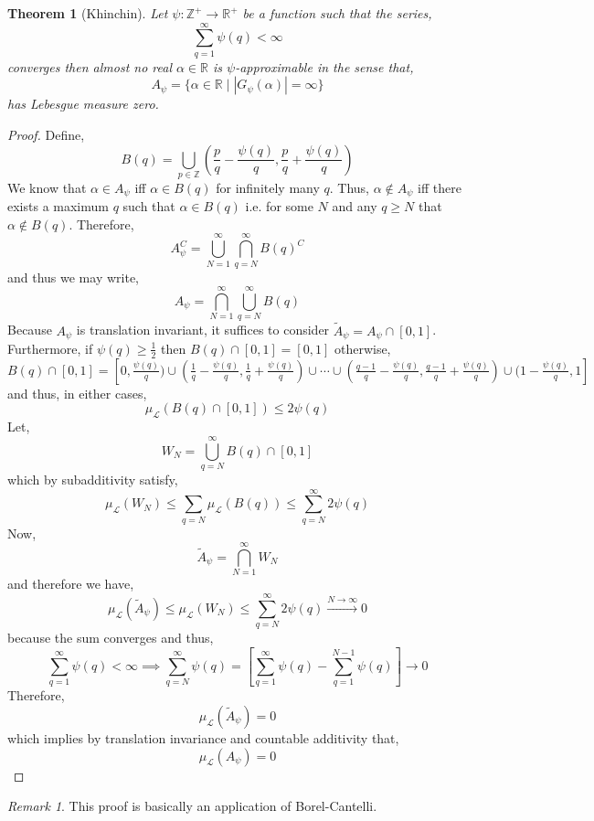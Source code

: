 \documentclass{article}
\newcommand{\Z}{\mathbb{Z}}
\newcommand{\Zplus}{\mathbb{Z}^{+}}
\newcommand{\R}{\mathbb{R}}
\newcommand{\Rplus}{\mathbb{R}^+}
\theoremstyle{theorem}
\newtheorem{theorem}{Theorem}[section]
\theoremstyle{definition}
\theoremstyle{definition}
\theoremstyle{remark}
\theoremstyle{definition}
\theoremstyle{remark}
\newtheorem{remark}{Remark}[subsection]
\begin{document}
\begin{theorem}[Khinchin]
Let $\psi : \Zplus \to \Rplus$ be a function such that the series,
\[ \sum_{q = 1}^\infty \psi(q) < \infty \]
converges then almost no real $\alpha \in \R$ is $\psi$-approximable in the sense that,
\[ A_\psi = \{ \alpha \in \R \mid |G_\psi(\alpha)| = \infty \} \]
has Lebesgue measure zero. 
\end{theorem}

\begin{proof}
Define,
\[ B(q) = \bigcup_{p \in \Z} \left( \frac{p}{q} - \frac{\psi(q)}{q}, \frac{p}{q} + \frac{\psi(q)}{q} \right) \]
We know that $\alpha \in A_\psi$ iff $\alpha \in B(q)$ for infinitely many $q$. Thus, $\alpha \notin A_\psi$ iff there exists a maximum $q$ such that $\alpha \in B(q)$ i.e. for some $N$ and any $q \ge N$ that $\alpha \notin B(q)$. Therefore,
\[ A_\psi^C = \bigcup_{N = 1}^\infty \bigcap_{q = N}^\infty B(q)^C \]
and thus we may write,
\[ A_\psi = \bigcap_{N = 1}^\infty \bigcup_{q = N}^\infty B(q) \]
Because $A_\psi$ is translation invariant, it suffices to consider $\tilde{A}_\psi = A_\psi \cap [0, 1]$. Furthermore, if $\psi(q) \ge \tfrac{1}{2}$ then $B(q) \cap [0, 1] = [0, 1]$ otherwise, 
\[ B(q) \cap [0,1] = [0, \tfrac{\psi(q)}{q}) \cup (\tfrac{1}{q} - \tfrac{\psi(q)}{q}, \tfrac{1}{q} + \tfrac{\psi(q)}{q}) \cup \cdots \cup (\tfrac{q-1}{q} - \tfrac{\psi(q)}{q}, \tfrac{q-1}{q} + \tfrac{\psi(q)}{q}) \cup (1 - \tfrac{\psi(q)}{q}, 1] \]
and thus, in either cases, 
\[ \mu_{\mathcal{L}} \left( B(q) \cap [0, 1]\right) \le 2 \psi(q) \]
Let,
\[ W_N = \bigcup_{q = N}^\infty B(q) \cap [0,1] \]
which by subadditivity satisfy,
\[ \mu_{\mathcal{L}}(W_N) \le \sum_{q = N} \mu_{\mathcal{L}}(B(q)) \le \sum_{q = N}^\infty 2 \psi(q) \]
Now,
\[ \tilde{A}_\psi = \bigcap_{N = 1}^\infty W_N \]
and therefore we have,
\[ \mu_{\mathcal{L}}(\tilde{A}_\psi) \le \mu_{\mathcal{L}}(W_N) \le \sum_{q = N}^\infty 2 \psi(q) \xrightarrow{N \to \infty} 0 \]
because the sum converges and thus,
\[ \sum_{q = 1}^\infty \psi(q) < \infty \implies \sum_{q = N}^\infty \psi(q) = \left[ \sum_{q = 1}^\infty \psi(q) - \sum_{q = 1}^{N-1} \psi(q) \right] \to  0 \]
Therefore, 
\[ \mu_{\mathcal{L}}(\tilde{A}_\psi) = 0 \]
which implies by translation invariance and countable additivity that,
\[ \mu_{\mathcal{L}}(A_\psi) = 0 \]
\end{proof}

\begin{remark}
This proof is basically an application of Borel-Cantelli.
\end{remark}
\end{document}
